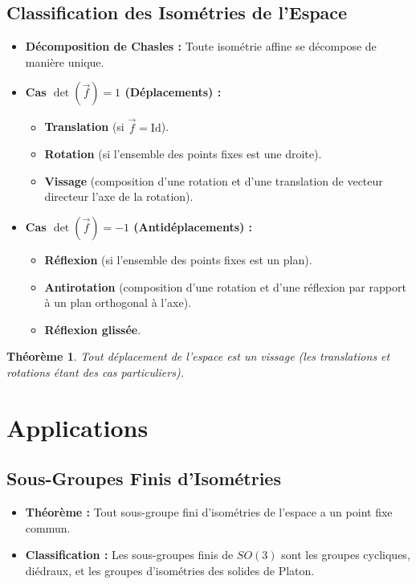 \documentclass[12pt, a4paper, parskip=full]{report}
\theoremstyle{agregstyle}
\newtheorem{theorem}[definition]{Théorème}
\begin{document}
\subsection{Classification des Isométries de l'Espace}
\begin{itemize}
    \item \textbf{Décomposition de Chasles :} Toute isométrie affine se décompose de manière unique.
    \item \textbf{Cas $\det(\vec{f})=1$ (Déplacements) :}
        \begin{itemize}
            \item \textbf{Translation} (si $\vec{f} = \mathrm{Id}$).
            \item \textbf{Rotation} (si l'ensemble des points fixes est une droite).
            \item \textbf{Vissage} (composition d'une rotation et d'une translation de vecteur directeur l'axe de la rotation).
        \end{itemize}
    \item \textbf{Cas $\det(\vec{f})=-1$ (Antidéplacements) :}
        \begin{itemize}
            \item \textbf{Réflexion} (si l'ensemble des points fixes est un plan).
            \item \textbf{Antirotation} (composition d'une rotation et d'une réflexion par rapport à un plan orthogonal à l'axe).
            \item \textbf{Réflexion glissée}.
        \end{itemize}
\end{itemize}
\begin{theorem}
    Tout déplacement de l'espace est un vissage (les translations et rotations étant des cas particuliers).
\end{theorem}

\section{Applications}
\subsection{Sous-Groupes Finis d'Isométries}
\begin{itemize}
    \item \textbf{Théorème :} Tout sous-groupe fini d'isométries de l'espace a un point fixe commun.
    \item \textbf{Classification :} Les sous-groupes finis de $SO(3)$ sont les groupes cycliques, diédraux, et les groupes d'isométries des solides de Platon.
\end{itemize}
\end{document}
